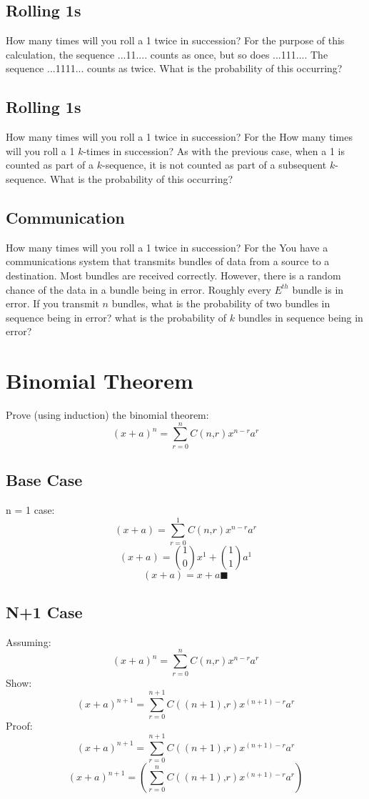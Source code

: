 \documentclass[a4paper,12pt]{article}
\begin{document}
\subsection{Rolling 1s}
How many times will you roll a 1 twice in succession?  For the
purpose of this calculation, the sequence ...11.... counts as once,
but so does ...111....  The sequence ...1111... counts as twice.  What
is the probability of this occurring?

\subsection{Rolling 1s}
How many times will you roll a 1 twice in succession?  For the
How many times will you roll a 1 $k$-times in succession?  As with
the previous case, when a 1 is counted as part of a $k$-sequence, it
is not counted as part of a subsequent $k$-sequence.  What
is the probability of this occurring?

\subsection{Communication}
How many times will you roll a 1 twice in succession?  For the
You have a communications system that transmits bundles of data
from a source to a destination.  Most bundles are received correctly.
However, there is a random chance of the data in a bundle being in
error.  Roughly every $E^{th}$ bundle is in error.  If you transmit
$n$ bundles, what is the probability of two bundles in sequence being
in error?  what is the probability of $k$ bundles in sequence being in
error?

\section{Binomial Theorem}
Prove (using induction) the binomial theorem:
\[
(x+a)^n = \sum_{r=0}^n C(n‚ r)x^{n-r}a^r
\]
\subsection{Base Case}
n = 1 case:\\
\[(x+a) = \sum_{r=0}^1 C(n‚ r)x^{n-r}a^r\]
\[(x+a) = \binom{1}{0} x^{1} + \binom{1}{1}  a^1\]
\[(x+a) = x+a \blacksquare \]
\subsection{N+1 Case}
Assuming:
\[
(x+a)^n = \sum_{r=0}^n C(n‚ r)x^{n-r}a^r
\]
Show:
\[(x+a)^{n+1} = \sum_{r=0}^{n+1} C((n+1)‚ r)x^{(n+1)-r}a^r\]
Proof:
\[(x+a)^{n+1} = \sum_{r=0}^{n+1} C((n+1)‚ r)x^{(n+1)-r}a^r\]
\[(x+a)^{n+1} = (\sum_{r=0}^{n} C((n+1)‚ r)x^{(n+1)-r}a^r) \]
\end{document}
